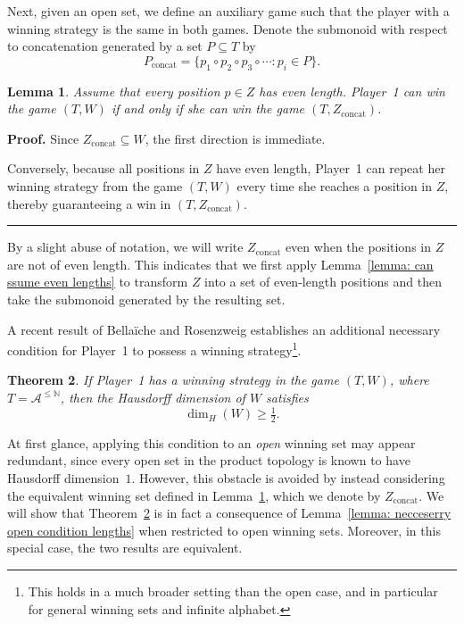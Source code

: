 \documentclass[a4,12pt]{article}%
\newtheorem{theorem}{Theorem}[section]
\newtheorem{lemma}[theorem]{Lemma}
\newenvironment{proof}[1][Proof]{\textbf{#1.} }{\ \rule{0.5em}{0.5em}}
\begin{document}
\medskip

Next, given an open set, we define an auxiliary game such that the player with a winning strategy is the same in both games.  
Denote the submonoid with respect to concatenation generated by a set $P \subseteq T$ by
\[
P _{\mathrm{concat}} = \{ p_1 \circ p_2 \circ p_3 \circ \cdots : p_i \in P \}.
\]

\begin{lemma} \label{lemma: concat is open}
Assume that every position $p \in Z$ has even length.  
Player~1 can win the game $(T,W)$ if and only if she can win the game $(T,Z_{\mathrm{concat}})$.
\end{lemma}

\begin{proof}
Since $Z_{\mathrm{concat}} \subseteq W$, the first direction is immediate.  

Conversely, because all positions in $Z$ have even length, Player~1 can repeat her winning strategy from the game $(T,W)$ every time she reaches a position in $Z$, thereby guaranteeing a win in $(T,Z_{\mathrm{concat}})$.  
\end{proof}

\medskip

By a slight abuse of notation, we will write $Z_{\mathrm{concat}}$ even when the positions in $Z$ are not of even length.  
This indicates that we first apply Lemma~\ref{lemma: can ssume even lengths} to transform $Z$ into a set of even-length positions and then take the submonoid generated by the resulting set.

A recent result of Bella{\"i}che and Rosenzweig \cite{DETwinnerHDIM} establishes an additional necessary condition for Player~1 to possess a winning strategy\footnote{This holds in a much broader setting than the open case, and in particular for general winning sets and infinite alphabet.}.

\begin{theorem}
\label{theorem: hausdorf 1/2}
If Player~1 has a winning strategy in the game $(T,W)$, where $T=\mathcal A^{\leq \mathbb N}$, then the Hausdorff dimension of $W$ satisfies
\[
\dim_H(W) \ge \tfrac12 .
\]
\end{theorem}

At first glance, applying this condition to an \emph{open} winning set may appear redundant, since every open set in the product topology is known to have Hausdorff dimension~$1$.  
However, this obstacle is avoided by instead considering the equivalent winning set defined in Lemma~\ref{lemma: concat is open}, which we denote by $Z_{\mathrm{concat}}$.  
We will show that Theorem~\ref{theorem: hausdorf 1/2} is in fact a consequence of Lemma~\ref{lemma: necceserry open condition lengths} when restricted to open winning sets.  
Moreover, in this special case, the two results are equivalent.
\end{document}
